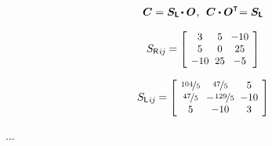 \begin{tcolorbox}
\begin{equation*}\begin{array}{c}
\bm{C} = \bm{S_{\smash{\mathsf{L}}}} \hspace{-0.25ex} \dotp \rotationtensor
\hspace{.1ex} , \:\:
\bm{C} \dotp \rotationtensor^{\T}\hspace{-0.5ex} = \bm{S_{\smash{\mathsf{L}}}}
\end{array}\end{equation*}

\begin{equation*}
S_{\smash{\mathsf{R}}\hspace{.15ex}i\hspace{-0.1ex}j} \hspace{-0.1ex} =
\scalebox{.92}[.92]{$
\left[ \hspace{-0.2ex}
   \begin{array}{ c@{\hspace{.6em}}c@{\hspace{.6em}}c }
      3 & 5 & -10 \\
      5 & 0 & 25 \\
      -10 & 25 & -5
   \end{array}
\hspace{-0.2ex} \right]
$}
\end{equation*}

\begin{equation*}
S_{ \smash{\mathsf{L}} \hspace{.15ex} i \hspace{-0.1ex} j } \hspace{-0.1ex}
=
\scalebox{.92}[.92]{$
   \left[ \hspace{-0.2ex}
   \begin{array}{c@{\hspace{.6em}}c@{\hspace{.6em}}c}
      \nicefrac{104}{5} & \nicefrac{47}{5} & 5 \\
      \nicefrac{47}{5} & - \hspace{.2ex} \nicefrac{129}{5} & -10 \\
      5 & -10 & 3
   \end{array}\hspace{-0.2ex}\right] $}
\end{equation*}

\par\end{tcolorbox}

...


